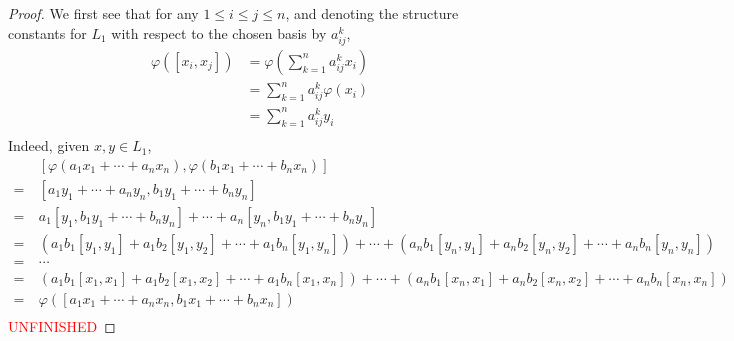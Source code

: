 \documentclass[12pt]{article}
\theoremstyle{definition}
\begin{document}
\begin{proof}
	We first see that for any $1 \leq i \leq j \leq n$, and denoting the structure constants for $L_1$ with respect to the chosen basis by $a_{ij}^k$, \begin{align*}
		\varphi([x_i, x_j]) & = \varphi \left( \sum_{k=1}^n a_{ij}^kx_i \right) \\
		                    & = \sum_{k=1}^n a_{ij}^k\varphi(x_i)               \\
		                    & = \sum_{k=1}^n a_{ij}^ky_i                        \\
	\end{align*}
	Indeed, given $x, y \in L_1$, \begin{align*}
		    & [\varphi(a_1x_1 + \cdots + a_nx_n), \varphi(b_1x_1 + \cdots + b_nx_n)]                                                                         \\
		=\  & [a_1y_1 + \cdots + a_ny_n, b_1y_1 + \cdots + b_ny_n]                                                                                           \\
		=\  & a_1[y_1, b_1y_1 + \cdots + b_ny_n] + \cdots + a_n[y_n, b_1y_1 + \cdots + b_ny_n]                                                               \\
		=\  & (a_1b_1[y_1, y_1] + a_1b_2[y_1, y_2] + \cdots + a_1b_n[y_1, y_n]) + \cdots + (a_nb_1[y_n, y_1] + a_nb_2[y_n, y_2] + \cdots + a_nb_n[y_n, y_n]) \\
		=\  & \cdots                                                                                                                                         \\
		=\  & (a_1b_1[x_1, x_1] + a_1b_2[x_1, x_2] + \cdots + a_1b_n[x_1, x_n]) + \cdots + (a_nb_1[x_n, x_1] + a_nb_2[x_n, x_2] + \cdots + a_nb_n[x_n, x_n]) \\
		=\  & \varphi([a_1x_1 + \cdots + a_nx_n, b_1x_1 + \cdots + b_nx_n])                                                                                  \\
	\end{align*}
	\textcolor{red}{UNFINISHED}
\end{proof}
\end{document}
